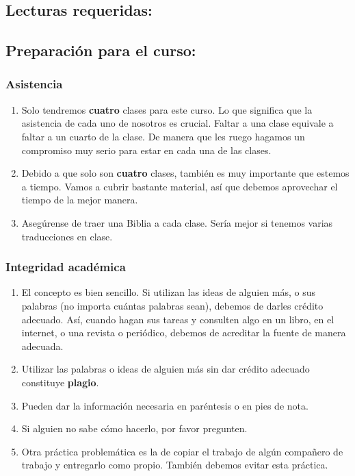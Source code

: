 \documentclass[letterpaper,12pt]{article}
\begin{document}
\subsection*{Lecturas requeridas:}


\subsection*{Preparación para el curso:}

\subsubsection*{Asistencia}
\begin{enumerate}
\item Solo tendremos \textbf{cuatro} clases para este curso. Lo que significa que la asistencia de cada uno de nosotros es crucial. Faltar a una clase equivale a faltar a un cuarto de la clase. De manera que les ruego hagamos un compromiso muy serio para estar en cada una de las clases.
\item Debido a que solo son \textbf{cuatro} clases, también es muy importante que estemos a tiempo. Vamos a cubrir bastante material, así que debemos aprovechar el tiempo de la mejor manera.
\item Asegúrense de traer una Biblia a cada clase. Sería mejor si tenemos varias traducciones en clase. 
\end{enumerate}

\subsubsection*{Integridad académica}
\begin{enumerate}
\item El concepto es bien sencillo. Si utilizan las ideas de alguien más, o sus palabras (no importa cuántas palabras sean), debemos de darles crédito adecuado. Así, cuando hagan sus tareas y consulten algo en un libro, en el internet, o una revista o periódico, debemos de acreditar la fuente de manera adecuada.
\item Utilizar las palabras o ideas de alguien más sin dar crédito adecuado constituye \textbf{plagio}.
\item Pueden dar la información necesaria en paréntesis o en pies de nota.
\item Si alguien no sabe cómo hacerlo, por favor pregunten.
\item Otra práctica problemática es la de copiar el trabajo de algún compañero de trabajo y entregarlo como propio. También debemos evitar esta práctica.
\end{enumerate}
\end{document}
